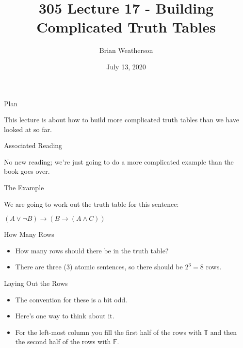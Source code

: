 \documentclass[
  ignorenonframetext,
]{beamer}
\title{305 Lecture 17 - Building Complicated Truth Tables}
\author{Brian Weatherson}
\date{July 13, 2020}
\providecommand{\tightlist}{%
  \setlength{\itemsep}{0pt}\setlength{\parskip}{0pt}}
\renewcommand{\,}{\text{, }}
\renewenvironment*{quote}	
	{\list{}{\rightmargin   \leftmargin} \item } 	
	{\endlist }
\def\True{\mathbb{T}}
\def\False{\mathbb{F}}
\begin{document}
\frame{\titlepage}

\begin{frame}{Plan}
\protect\hypertarget{plan}{}

This lecture is about how to build more complicated truth tables than we
have looked at so far.

\end{frame}

\begin{frame}{Associated Reading}
\protect\hypertarget{associated-reading}{}

No new reading; we're just going to do a more complicated example than
the book goes over.

\end{frame}

\begin{frame}{The Example}
\protect\hypertarget{the-example}{}

We are going to work out the truth table for this sentence:

\begin{quote}
\((A \vee \neg B) \rightarrow (B \rightarrow (A \wedge C))\)
\end{quote}

\end{frame}

\begin{frame}{How Many Rows}
\protect\hypertarget{how-many-rows}{}

\begin{itemize}[<+->]
\tightlist
\item
  How many rows should there be in the truth table?
\item
  There are three (3) atomic sentences, so there should be \(2^3 = 8\)
  rows.
\end{itemize}

\end{frame}

\begin{frame}{Laying Out the Rows}
\protect\hypertarget{laying-out-the-rows}{}

\begin{itemize}
\tightlist
\item
  The convention for these is a bit odd.
\item
  Here's one way to think about it.
\item
  For the left-most column you fill the first half of the rows with
  \(\True\) and then the second half of the rows with \(\False\).
\end{itemize}

\end{frame}
\end{document}
